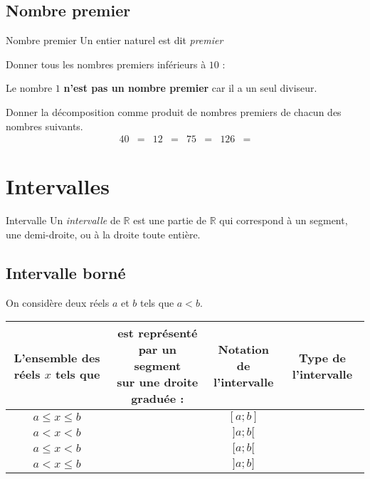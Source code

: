 \documentclass[11pt]{article}
\begin{document}
\subsection{Nombre premier}
\begin{defi}{Nombre premier}
  Un entier naturel est dit \emph{premier} \phantom{s'il possède exactement deux
  diviseurs distincts : $1$ et lui-même.}
  \vspace{.5cm}
\end{defi}
\begin{exemple}
  Donner tous les nombres premiers inférieurs à $10$ :
\end{exemple}
\begin{rmq}
  Le nombre $1$ \textbf{n'est pas un nombre premier} car il a un seul diviseur.
\end{rmq}
\begin{exemple}
  Donner la décomposition comme produit de nombres premiers de chacun des
  nombres suivants.
  \begin{align*}
    40 &= &
    12 &= &
    75 &= &
    126 &=
  \end{align*}
\end{exemple}

\section{Intervalles}
\begin{defi}{Intervalle}
  Un \emph{intervalle} de $\mathbb{R}$ est une partie de $\mathbb{R}$ qui
  correspond à un segment, une demi-droite, ou à la droite toute entière.  
\end{defi}

\subsection{Intervalle borné}
On considère deux réels $a$ et $b$ tels que $a<b$.
\begin{center}
  \renewcommand{\arraystretch}{2}
  \begin{tabular}{|c|c|c|c|}
    \hline
    \makecell{L'ensemble des\\réels $x$ tels que} & \makecell{est représenté par
      un \textbf{segment}\\sur une droite graduée :} &\makecell{Notation
      de\\l'intervalle} & {Type de l'intervalle} \\
      \hline
      $a \leq x \leq b$ & & $[a;b]$ & \\
      \hline
      $a < x < b$ & & $]a;b[$ & \\
      \hline
      $a \leq x < b$ & & $[a;b[$ & \\
      \hline
      $a < x \leq b$ & & $]a;b]$ & \\
      \hline
  \end{tabular}
\end{center}
\end{document}

